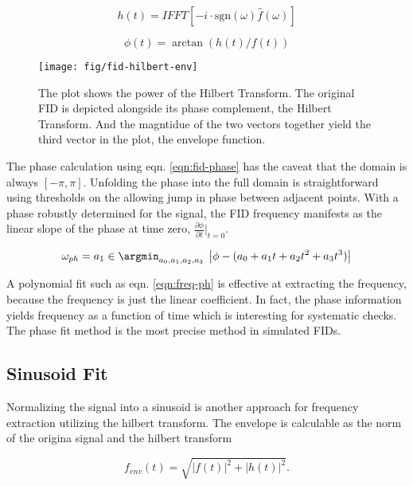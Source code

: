 \begin{equation}
\label{eqn:hilbert-transform}
h(t) = IFFT[-i \cdot \mathrm{sgn}(\omega) \hat{f}(\omega)]
\end{equation}

\begin{equation}
\label{eqn:fid-phase}
\phi(t) = \arctan(h(t) / f(t))
\end{equation}

\begin{figure}
\label{fig:fid-hilbert-env}
\texttt{[image: fig/fid-hilbert-env]}
\caption{The plot shows the power of the Hilbert Transform.  The original FID is depicted alongside its phase complement, the Hilbert Transform.  And the magntidue of the two vectors together yield the third vector in the plot, the envelope function.}
\end{figure}

\noindent
The phase calculation using eqn. \ref{eqn:fid-phase} has the caveat that the domain is always $[-\pi, \pi]$.  Unfolding the phase into the full domain is straightforward using thresholds on the allowing jump in phase between adjacent points.  With a phase robustly determined for the signal, the FID frequency manifests as the linear slope of the phase at time zero, $\frac{\partial \phi}{\partial t}|_{t=0}$.

\begin{equation}
\label{eqn:freq-ph}
\omega_{ph} = a_1 \in \argmin_{a_0, a_1, a_2, a_3} \;
\left| \phi - (a_0 + a_1 t + a_2 t^2 + a_3 t^3) \right|
\end{equation}

A polynomial fit such as eqn. \ref{eqn:freq-ph} is effective at extracting the frequency, because the frequency is just the linear coefficient.  In fact, the phase information yields frequency as a function of time which is interesting for systematic checks.  The phase fit method is the most precise method in simulated FIDs.

\subsection{Sinusoid Fit}
Normalizing the signal into a sinusoid is another approach for frequency extraction utilizing the hilbert transform.  The envelope is calculable as the norm of the origina signal and the hilbert transform

\begin{equation}
\label{eqn:fid-envelope}
f_{env}(t) = \sqrt{|f(t)|^2 + |h(t)|^2}.
\end{equation}

